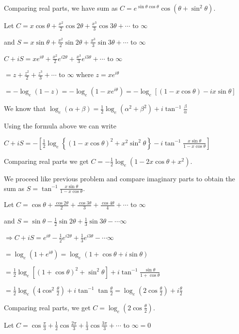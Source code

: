   Comparing real parts, we have sum as $C = e^{\sin\theta\cos\theta}\cos(\theta + \sin^2\theta)$.
\item Let $C = x\cos\theta + \frac{x^2}{2}\cos2\theta + \frac{x^3}{3}\cos3\theta +
  \cdots$ to $\infty$

  and $S = x\sin\theta + \frac{x^2}{2}\sin2\theta + \frac{x^3}{3}\sin3\theta +
  \cdots$ to $\infty$

  $C + iS = xe^{i\theta} + \frac{x^2}{2}e^{i2\theta} + \frac{x^3}{3}e^{i3\theta} + \cdots$ to $\infty$

  $= z + \frac{z^2}{2} + \frac{z^3}{3} + \cdots$ to $\infty$ where $z = xe^{i\theta}$

  $= -\log_e(1 - z) = -\log_e\left(1 - xe^{i\theta}\right) = -\log_e[(1 - x\cos\theta) - ix\sin\theta]$

  We know that $\log_e(\alpha + \beta) = \frac{1}{2}\log_e\left(\alpha^2 + \beta^2\right) +
  i\tan^{-1}\frac{\beta}{\alpha}$

  Using the formula above we can write

  $C + iS = -\left[\frac{1}{2}\log_e\left\{(1 - x\cos\theta)^2 + x^2\sin^2\theta\right\} -
    i\tan^{-1}\frac{x\sin\theta}{1 - x\cos\theta}\right]$

  Comparing real parts we get $C = -\frac{1}{2}\log_e(1 - 2x\cos\theta + x^2)$.
\item We proceed like previous problem and compare imaginary parts to obtain the sum as $S =
  \tan^{-1}\frac{x\sin\theta}{1 - x\cos\theta}$.
\item Let $C = \cos\theta + \frac{\cos2\theta}{2} + \frac{\cos3\theta}{3} +
  \frac{\cos4\theta}{4} + \cdots$ to $\infty$

  and $S = \sin\theta - \frac{1}{2}\sin2\theta + \frac{1}{3}\sin3\theta - \cdots \infty$

  $\Rightarrow C + iS = e^{i\theta} - \frac{1}{2}e^{i2\theta} + \frac{1}{3}e^{i3\theta} - \cdots \infty$

  $= \log_e\left(1 + e^{i\theta}\right) = \log_e(1 + \cos\theta + i\sin\theta)$

  $= \frac{1}{2}\log_e\left[(1 + \cos\theta)^2 + \sin^2\theta\right] + i\tan^{-1}\frac{\sin\theta}{1 +
    \cos\theta}$

  $ = \frac{1}{2}\log_e\left(4\cos^2\frac{\theta}{2}\right) + i\tan^{-1}\tan\frac{\theta}{2} =
  \log_e\left(2\cos\frac{\theta}{2}\right) + i\frac{\theta}{2}$

  Comparing real parts, we get $C = \log_e\left(2\cos\frac{\theta}{2}\right)$.
\item Let $C = \cos\frac{\pi}{3} + \frac{1}{2}\cos\frac{2\pi}{3} + \frac{1}{3}\cos\frac{3\pi}{3} +
  \cdots$ to $\infty = 0$

